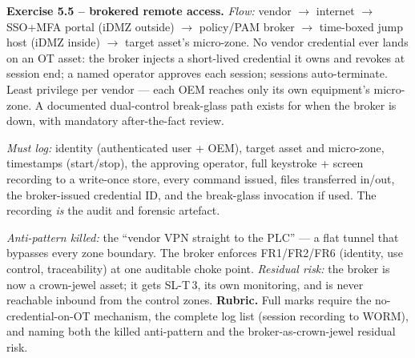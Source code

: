 \documentclass[11pt,a4paper]{article}
\begin{document}
\begin{solutionbox}
\textbf{Exercise 5.5 -- brokered remote access.}
\emph{Flow:} vendor $\to$ internet $\to$ SSO+MFA portal (iDMZ outside) $\to$ policy/PAM broker $\to$ time-boxed jump host (iDMZ inside) $\to$ target asset's micro-zone. No vendor credential ever lands on an OT asset: the broker injects a short-lived credential it owns and revokes at session end; a named operator approves each session; sessions auto-terminate. Least privilege per vendor --- each OEM reaches only its own equipment's micro-zone. A documented dual-control break-glass path exists for when the broker is down, with mandatory after-the-fact review.
\par\vspace{2mm}
\emph{Must log:} identity (authenticated user + OEM), target asset and micro-zone, timestamps (start/stop), the approving operator, full keystroke + screen recording to a write-once store, every command issued, files transferred in/out, the broker-issued credential ID, and the break-glass invocation if used. The recording \emph{is} the audit and forensic artefact.
\par\vspace{2mm}
\emph{Anti-pattern killed:} the ``vendor VPN straight to the PLC'' --- a flat tunnel that bypasses every zone boundary. The broker enforces FR1/FR2/FR6 (identity, use control, traceability) at one auditable choke point. \emph{Residual risk:} the broker is now a crown-jewel asset; it gets SL-T\,3, its own monitoring, and is never reachable inbound from the control zones. \textbf{Rubric.} Full marks require the no-credential-on-OT mechanism, the complete log list (session recording to WORM), and naming both the killed anti-pattern and the broker-as-crown-jewel residual risk.
\end{solutionbox}
\end{document}
